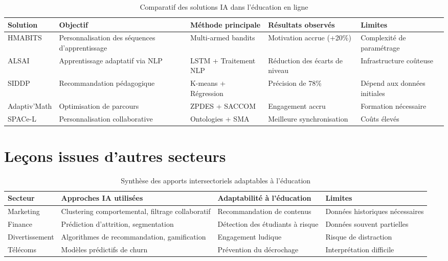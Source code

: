 \documentclass[12pt, a4paper]{article}
\begin{document}
	\begin{table}[htbp]
		\centering
		\caption{Comparatif des solutions IA dans l'éducation en ligne}
		\label{tab:comparatif_education}
		\begin{adjustbox}{width=\textwidth}
			\begin{tabular}{|L{2cm}|L{3cm}|L{2.5cm}|L{2.5cm}|L{2cm}|}
				\hline
				\textbf{Solution} & \textbf{Objectif} & \textbf{Méthode principale} & \textbf{Résultats observés} & \textbf{Limites} \\ \hline
				HMABITS & Personnalisation des séquences d'apprentissage & Multi-armed bandits & Motivation accrue (+20\%) & Complexité de paramétrage \\ \hline
				ALSAI & Apprentissage adaptatif via NLP & LSTM + Traitement NLP & Réduction des écarts de niveau & Infrastructure coûteuse \\ \hline
				SIDDP & Recommandation pédagogique & K-means + Régression & Précision de 78\% & Dépend aux données initiales \\ \hline
				Adaptiv'Math & Optimisation de parcours & ZPDES + SACCOM & Engagement accru & Formation nécessaire \\ \hline
				SPACe-L & Personnalisation collaborative & Ontologies + SMA & Meilleure synchronisation & Coûts élevés \\ \hline
			\end{tabular}
		\end{adjustbox}
	\end{table}
	
	\section{Leçons issues d'autres secteurs}
	\label{sec:lecons}
	
	\begin{table}[htbp]
		\centering
		\caption{Synthèse des apports intersectoriels adaptables à l'éducation}
		\label{tab:synthèse_secteurs}
		\begin{adjustbox}{width=\textwidth}
			\begin{tabular}{|L{2cm}|L{3.5cm}|L{3.5cm}|L{2cm}|}
				\hline
				\textbf{Secteur} & \textbf{Approches IA utilisées} & \textbf{Adaptabilité à l'éducation} & \textbf{Limites} \\ \hline
				Marketing & Clustering comportemental, filtrage collaboratif & Recommandation de contenus & Données historiques nécessaires \\ \hline
				Finance & Prédiction d'attrition, segmentation & Détection des étudiants à risque & Données souvent partielles \\ \hline
				Divertissement & Algorithmes de recommandation, gamification & Engagement ludique & Risque de distraction \\ \hline
				Télécoms & Modèles prédictifs de churn & Prévention du décrochage & Interprétation difficile \\ \hline
			\end{tabular}
		\end{adjustbox}
	\end{table}
	
\end{document}
